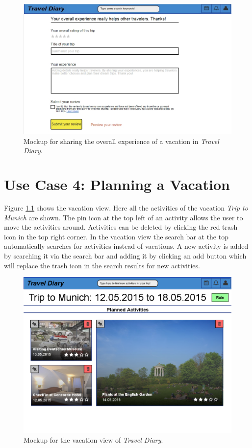 \documentclass[IN,english]{tumbook}
\begin{document}
\begin{figure}[h]
	\begin{center}
		\includegraphics[width=\textwidth]{graphics/usecase3}
	\end{center}
	\label{fig:usecase3}
	\caption{Mockup for sharing the overall experience of a vacation in \emph{Travel Diary}.}
\end{figure}

\newpage

\chapter{Use Case 4: Planning a Vacation}

Figure \ref{fig:usecase4} shows the vacation view. Here all the activities of the vacation \emph{Trip to Munich} are shown. The pin icon at the top left of an activity allows the user to move the activities around. Activities can be deleted by clicking the red trash icon in the top right corner. In the vacation view the search bar at the top automatically searches for activities instead of vacations. A new activity is added by searching it via the search bar and adding it by clicking an add button which will replace the trash icon in the search results for new activities.

\begin{figure}[h]
	\begin{center}
		\includegraphics[width=\textwidth]{graphics/usecase4}
	\end{center}
	\label{fig:usecase4}
	\caption{Mockup for the vacation view of \emph{Travel Diary}.}
\end{figure}
\end{document}
